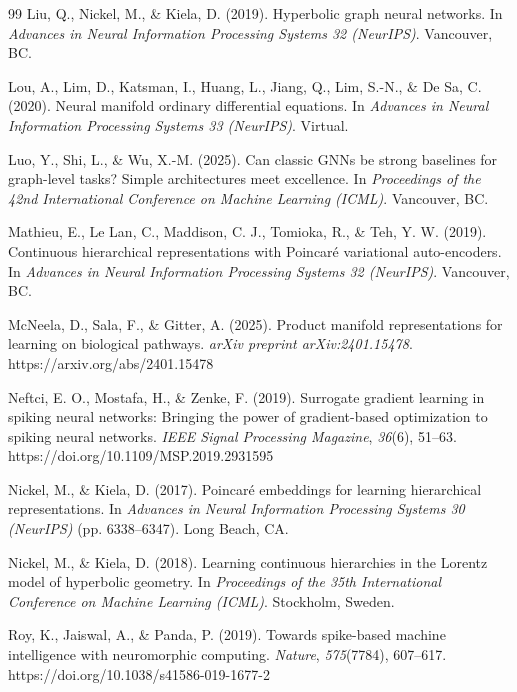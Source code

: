 \documentclass[a4paper,fleqn]{cas-dc}
\begin{document}
\begin{thebibliography}{99}
Liu, Q., Nickel, M., \& Kiela, D. (2019). Hyperbolic graph neural networks. In \textit{Advances in Neural Information Processing Systems 32 (NeurIPS)}. Vancouver, BC.

Lou, A., Lim, D., Katsman, I., Huang, L., Jiang, Q., Lim, S.-N., \& De Sa, C. (2020). Neural manifold ordinary differential equations. In \textit{Advances in Neural Information Processing Systems 33 (NeurIPS)}. Virtual.

Luo, Y., Shi, L., \& Wu, X.-M. (2025). Can classic GNNs be strong baselines for graph-level tasks? Simple architectures meet excellence. In \textit{Proceedings of the 42nd International Conference on Machine Learning (ICML)}. Vancouver, BC.

Mathieu, E., Le Lan, C., Maddison, C. J., Tomioka, R., \& Teh, Y. W. (2019). Continuous hierarchical representations with Poincar\'e variational auto-encoders. In \textit{Advances in Neural Information Processing Systems 32 (NeurIPS)}. Vancouver, BC.

McNeela, D., Sala, F., \& Gitter, A. (2025). Product manifold representations for learning on biological pathways. \textit{arXiv preprint arXiv:2401.15478}. https://arxiv.org/abs/2401.15478

Neftci, E. O., Mostafa, H., \& Zenke, F. (2019). Surrogate gradient learning in spiking neural networks: Bringing the power of gradient-based optimization to spiking neural networks. \textit{IEEE Signal Processing Magazine}, \textit{36}(6), 51--63. https://doi.org/10.1109/MSP.2019.2931595

Nickel, M., \& Kiela, D. (2017). Poincar\'e embeddings for learning hierarchical representations. In \textit{Advances in Neural Information Processing Systems 30 (NeurIPS)} (pp. 6338--6347). Long Beach, CA.

Nickel, M., \& Kiela, D. (2018). Learning continuous hierarchies in the Lorentz model of hyperbolic geometry. In \textit{Proceedings of the 35th International Conference on Machine Learning (ICML)}. Stockholm, Sweden.

Roy, K., Jaiswal, A., \& Panda, P. (2019). Towards spike-based machine intelligence with neuromorphic computing. \textit{Nature}, \textit{575}(7784), 607--617. https://doi.org/10.1038/s41586-019-1677-2


\end{thebibliography}
\end{document}
